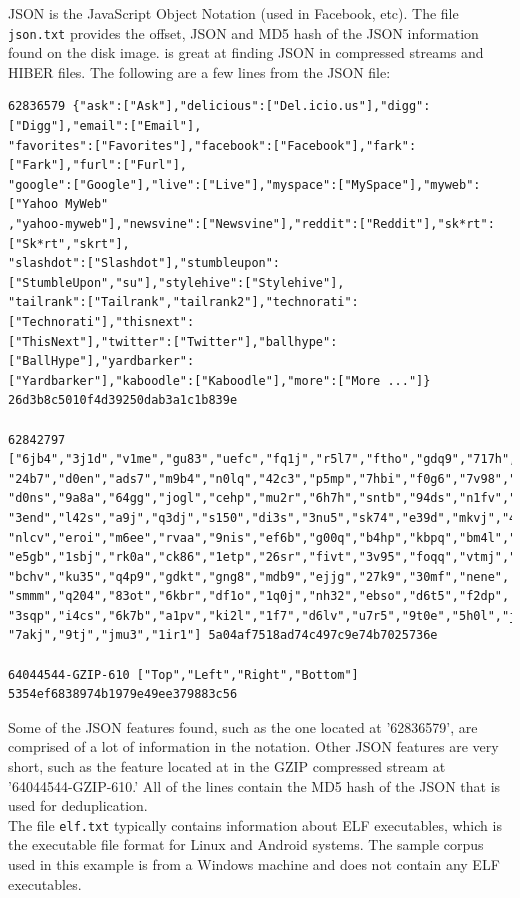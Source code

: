 JSON is the JavaScript Object Notation (used in Facebook, etc). The file \texttt{json.txt}  provides the offset, JSON and MD5 hash of the JSON information found on the disk image. \bulk is great at finding JSON in compressed streams and HIBER files. The following are a few lines from the JSON file:
\lstset{style=customfile}
\begin{lstlisting}
62836579 {"ask":["Ask"],"delicious":["Del.icio.us"],"digg":["Digg"],"email":["Email"],
"favorites":["Favorites"],"facebook":["Facebook"],"fark":["Fark"],"furl":["Furl"],
"google":["Google"],"live":["Live"],"myspace":["MySpace"],"myweb":["Yahoo MyWeb"
,"yahoo-myweb"],"newsvine":["Newsvine"],"reddit":["Reddit"],"sk*rt":["Sk*rt","skrt"],
"slashdot":["Slashdot"],"stumbleupon":["StumbleUpon","su"],"stylehive":["Stylehive"],
"tailrank":["Tailrank","tailrank2"],"technorati":["Technorati"],"thisnext":
["ThisNext"],"twitter":["Twitter"],"ballhype":["BallHype"],"yardbarker":
["Yardbarker"],"kaboodle":["Kaboodle"],"more":["More ..."]}	
26d3b8c5010f4d39250dab3a1c1b839e

62842797 ["6jb4","3j1d","v1me","gu83","uefc","fq1j","r5l7","ftho","gdq9","717h",
"24b7","d0en","ads7","m9b4","n0lq","42c3","p5mp","7hbi","f0g6","7v98","mv86", 
"d0ns","9a8a","64gg","jogl","cehp","mu2r","6h7h","sntb","94ds","n1fv","3a2i",
"3end","l42s","a9j","q3dj","s150","di3s","3nu5","sk74","e39d","mkvj","482d","kfej",
"nlcv","eroi","m6ee","rvaa","9nis","ef6b","g00q","b4hp","kbpq","bm4l","f7iu",
"e5gb","1sbj","rk0a","ck86","1etp","26sr","fivt","3v95","foqq","vtmj","canb",
"bchv","ku35","q4p9","gdkt","gng8","mdb9","ejjg","27k9","30mf","nene",
"smmm","q204","83ot","6kbr","df1o","1q0j","nh32","ebso","d6t5","f2dp",
"3sqp","i4cs","6k7b","a1pv","ki2l","1f7","d6lv","u7r5","9t0e","5h0l","j8kn",
"7akj","9tj","jmu3","1ir1"]	5a04af7518ad74c497c9e74b7025736e

64044544-GZIP-610 ["Top","Left","Right","Bottom"] 5354ef6838974b1979e49ee379883c56
\end{lstlisting}
Some of the JSON features found, such as the one located at '62836579', are comprised of a lot of information in the notation. Other JSON features are very short, such as the feature located at in the GZIP compressed stream at '64044544-GZIP-610.' All of the lines contain the MD5 hash of the JSON that is used for deduplication.\\

The file \texttt{elf.txt} typically contains information about ELF executables, which is the executable file format for Linux and Android systems. The sample corpus used in this example is from a Windows machine and does not contain any ELF executables.

